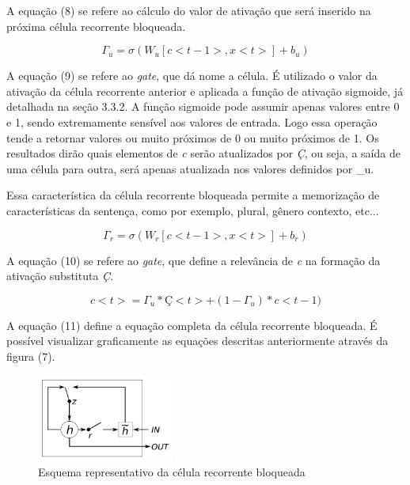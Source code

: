 \documentclass[12pt]{article}
\begin{document}
A equação (8) se refere ao cálculo do valor de ativação que será inserido na próxima célula recorrente bloqueada.

\begin{equation}
    \Gamma_u = \sigma(W_u[c<t-1>, x<t>]+b_u)
\end{equation}

A equação (9) se refere ao \textit{gate}, que dá nome a célula. É utilizado o valor da ativação da célula recorrente anterior e aplicada a função de ativação sigmoide, já detalhada na seção 3.3.2. A função sigmoide pode assumir apenas valores entre 0 e 1, sendo extremamente sensível aos valores de entrada. Logo essa operação tende a retornar valores ou muito próximos de 0 ou muito próximos de 1. Os resultados dirão quais elementos de \textit{c} serão atualizados por \textit{Ç}, ou seja, a saída de uma célula para outra, será apenas atualizada nos valores definidos por \Gamma_u.

Essa característica da célula recorrente bloqueada permite a memorização de características da sentença, como por exemplo, plural, gênero contexto, etc...

\begin{equation}
    \Gamma_r = \sigma(W_r[c<t-1>, x<t>]+b_r)
\end{equation}

A equação (10) se refere ao \textit{gate}, que define a relevância de \textit{c} na formação da ativação substituta \textit{Ç}.

\begin{equation}
    c<t>=\Gamma_u*Ç<t>+(1-\Gamma_u)*c<t-1)
\end{equation}

A equação (11) define a equação completa da célula recorrente bloqueada. É possível visualizar graficamente as equações descritas anteriormente através da figura (7).

\begin{figure}[!htb]
\centering
\includegraphics[width=0.4\textwidth]{images/gru_gate.png}
\caption{Esquema representativo da célula recorrente bloqueada \cite{DBLP:journals/corr/ChungGCB14}}
\label{fig:gru_gaet}
\end{figure}
\end{document}
